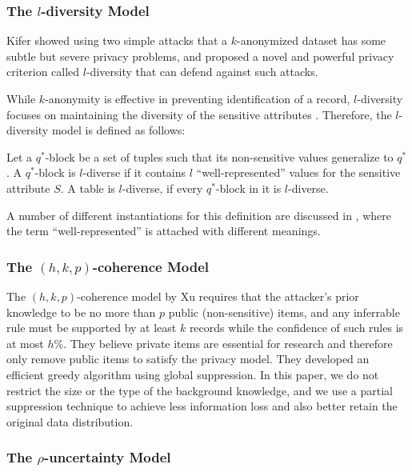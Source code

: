 \subsubsection{The $l$-diversity Model}
Kifer \etal \cite{Kifer:l-diversity} showed using two simple attacks that a
$k$-anonymized dataset has some subtle but severe privacy problems, and
proposed a novel and powerful privacy criterion called $l$-diversity that
can defend against such attacks.

While $k$-anonymity is effective in preventing identification of a record,
$l$-diversity focuses on maintaining the diversity of the sensitive attributes \cite{aggarwal2008general}.
Therefore, the $l$-diversity model is defined as follows:

\begin{definition}
  Let a $q^*$-block be a set of tuples such that its non-sensitive values
  generalize to $q^*$.  A $q^*$-block is $l$-diverse if it contains $l$
  ``well-represented'' values for the sensitive attribute $S$.  A table
  is $l$-diverse, if every $q^*$-block in it is $l$-diverse.
\end{definition}

A number of different instantiations for this definition are discussed
in \cite{Kifer:l-diversity}, where the term
``well-represented'' is attached with different meanings.

\subsubsection{The $(h,k,p)$-coherence Model}
The $(h,k,p)$-coherence model by Xu \etal \cite{Xu:2008:ATD}
requires that the attacker's prior knowledge to be no more than $p$ public
(non-sensitive) items, and any inferrable rule must be supported by at least
$k$ records while the confidence of such rules is at most $h$\%. They believe
private items are essential for research and therefore only remove public
items to satisfy the privacy model. They developed an efficient greedy
algorithm using global suppression. In this paper, we do not restrict the
size or the type of the background knowledge, and we use a partial
suppression technique to achieve less information loss and also better retain
the original data distribution.

\subsubsection{The $\rho$-uncertainty Model}

